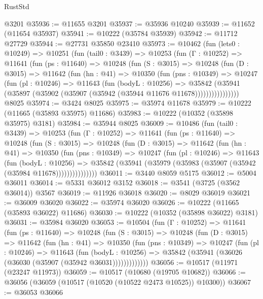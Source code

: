 \begin{lexlean}{RustStd}
\begin{coremodule}
    @3201
@35936 := @11655 @3201
@35937 := @35936 @10240
@35939 := @11652 (@11654 @35937)
@35941 := @10222 (@35784 @35939)
@35942 := @11712 @27729
@35944 := @27731 @35850 @23410
@35973 := @10462
    (fun (lets0 : @10249) =>
    @10251
      (fun (tail0 : @3439) =>
      @10253
        (fun (Γ : @10252) =>
        @11641
          (fun (ps : @11640) =>
          @10248
            (fun (S : @3015) =>
            @10248
              (fun (D : @3015) =>
              @11642
                (fun (hn : @41) =>
                @10350
                  (fun (pns : @10349) =>
                  @10247
                    (fun (pl : @10246) =>
                    @11643
                      (fun (bodyL : @10256) =>
                      @35842
                        (@35941
                          (@35897 (@35902 (@35907 (@35942 (@35944 @11676 @11678))))))))))))))))
    @8025
@35974 := @3424 @8025
@35975 := @35974 @11678
@35979 := @10222 (@11665 (@35893 @35975) @11686)
@35983 := @10222 (@10352 (@35898 @35975) @3181)
@35984 := @35944 @8025
@36009 := @10486
    (fun (tail0 : @3439) =>
    @10253
      (fun (Γ : @10252) =>
      @11641
        (fun (ps : @11640) =>
        @10248
          (fun (S : @3015) =>
          @10248
            (fun (D : @3015) =>
            @11642
              (fun (hn : @41) =>
              @10350
                (fun (pns : @10349) =>
                @10247
                  (fun (pl : @10246) =>
                  @11643
                    (fun (bodyL : @10256) =>
                    @35842 (@35941 (@35979 (@35983 (@35907 (@35942 (@35984 @11678)))))))))))))))
@36011 := @3440 @8059 @5175
@36012 := @5004 @36011
@36014 := @5331 @36012 @3152
@36018 := @3541 (@3725 (@3562 @36014)) @3567
@36019 := @11926 @36018
@36020 := @8029 @36019
@36021 := @36009 @36020
@36022 := @35974 @36020
@36026 := @10222 (@11665 (@35893 @36022) @11686)
@36030 := @10222 (@10352 (@35898 @36022) @3181)
@36031 := @35984 @36020
@36053 := @10504
    (fun (Γ : @10252) =>
    @11641
      (fun (ps : @11640) =>
      @10248
        (fun (S : @3015) =>
        @10248
          (fun (D : @3015) =>
          @11642
            (fun (hn : @41) =>
            @10350
              (fun (pns : @10349) =>
              @10247
                (fun (pl : @10246) =>
                @11643
                  (fun (bodyL : @10256) =>
                  @35842 (@35941 (@36026 (@36030 (@35907 (@35942 @36031)))))))))))))
@36056 := @10517 (@11971 (@23247 @11973))
@36059 := @10517 (@10680 (@19705 @10682))
@36066 := @36056 (@36059 (@10517 (@10520 (@10522 @2473 @10525)) @10300))
@36067 := @36053 @36066

\end{coremodule}
\end{lexlean}
